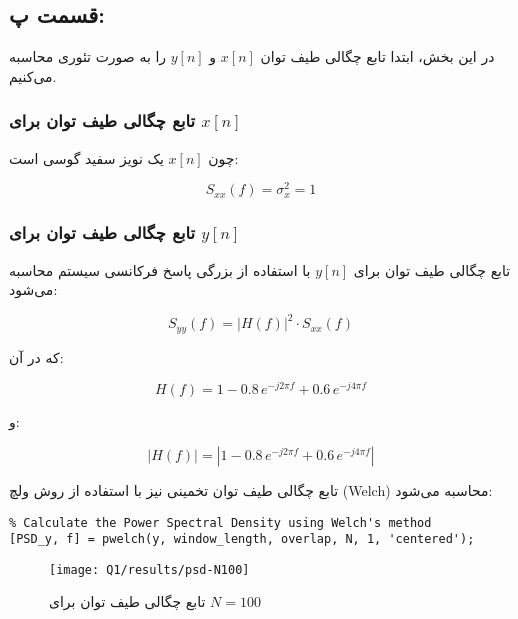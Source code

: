 \documentclass[12pt,onecolumn,a4paper]{article}
\begin{document}
		\FloatBarrier
		\subsection{قسمت پ:}

		
		در این بخش، ابتدا تابع چگالی طیف توان \( x[n] \) و \( y[n] \) را به صورت تئوری محاسبه می‌کنیم.
		
		\subsubsection{تابع چگالی طیف توان برای \( x[n] \)}
		چون \( x[n] \) یک نویز سفید گوسی است:
		
		\begin{equation}
			S_{xx}(f) = \sigma_x^2 = 1
		\end{equation}
		
		\subsubsection{تابع چگالی طیف توان برای \( y[n] \)}
		تابع چگالی طیف توان برای \( y[n] \) با استفاده از بزرگی پاسخ فرکانسی سیستم محاسبه می‌شود:
		
		\begin{equation}
			S_{yy}(f) = |H(f)|^2 \cdot S_{xx}(f)
		\end{equation}
		
		که در آن:
		
		\begin{equation}
			H(f) = 1 - 0.8 \, e^{-j 2\pi f} + 0.6 \, e^{-j 4\pi f}
		\end{equation}
		
		و:
		
		\begin{equation}
			|H(f)| = \left| 1 - 0.8 \, e^{-j 2\pi f} + 0.6 \, e^{-j 4\pi f} \right|
		\end{equation}
		
		تابع چگالی طیف توان تخمینی نیز با استفاده از روش ولچ (Welch) محاسبه می‌شود:
		
\begin{latin}
\begin{lstlisting}
% Calculate the Power Spectral Density using Welch's method
[PSD_y, f] = pwelch(y, window_length, overlap, N, 1, 'centered');
\end{lstlisting}
\end{latin}
		
		\begin{figure}[H]
			\centering
			\texttt{[image: Q1/results/psd-N100]}
			\caption{تابع چگالی طیف توان برای \( N = 100 \)}
			\label{fig:psd-n100}
		\end{figure}
		
\end{document}
